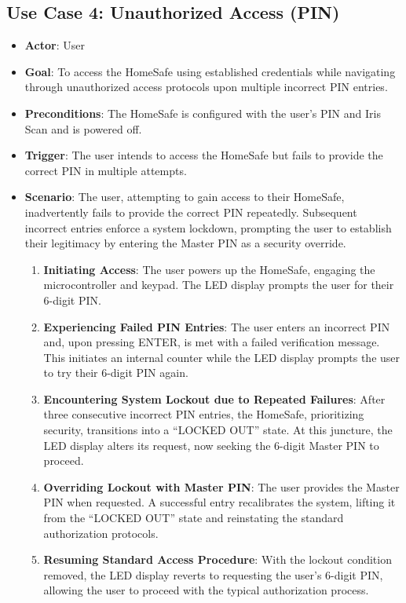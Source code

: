 \documentclass{article}
\begin{document}
\subsection{Use Case 4: Unauthorized Access (PIN)}
\begin{itemize}
    \item \textbf{Actor}: User
    \item \textbf{Goal}: To access the HomeSafe using established credentials while navigating through unauthorized access protocols upon multiple incorrect PIN entries.
    \item \textbf{Preconditions}:  The HomeSafe is configured with the user’s PIN and Iris Scan and is powered off.
    \item \textbf{Trigger}: The user intends to access the HomeSafe but fails to provide the correct PIN in multiple attempts.
    \item \textbf{Scenario}: The user, attempting to gain access to their HomeSafe, inadvertently fails to provide the correct PIN repeatedly. Subsequent incorrect entries enforce a system lockdown, prompting the user to establish their legitimacy by entering the Master PIN as a security override.
    \begin{enumerate}
    \item \textbf{Initiating Access}: The user powers up the HomeSafe, engaging the microcontroller and keypad. The LED display prompts the user for their 6-digit PIN.
    \item \textbf{Experiencing Failed PIN Entries}: The user enters an incorrect PIN and, upon pressing ENTER, is met with a failed verification message. This initiates an internal counter while the LED display prompts the user to try their 6-digit PIN again.
    \item \textbf{Encountering System Lockout due to Repeated Failures}: After three consecutive incorrect PIN entries, the HomeSafe, prioritizing security, transitions into a “LOCKED OUT” state. At this juncture, the LED display alters its request, now seeking the 6-digit Master PIN to proceed.
    \item \textbf{Overriding Lockout with Master PIN}: The user provides the Master PIN when requested. A successful entry recalibrates the system, lifting it from the “LOCKED OUT” state and reinstating the standard authorization protocols.
    \item \textbf{Resuming Standard Access Procedure}: With the lockout condition removed, the LED display reverts to requesting the user’s 6-digit PIN, allowing the user to proceed with the typical authorization process.
    \end{enumerate}
\end{itemize}
\end{document}
